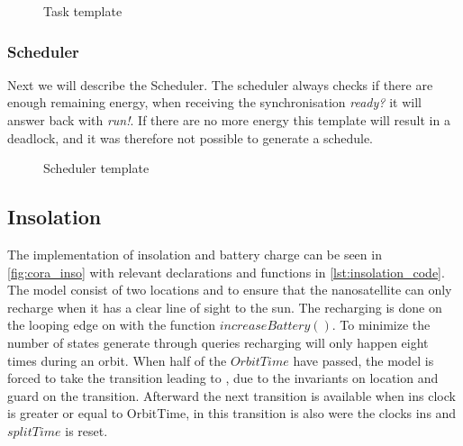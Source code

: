 \begin{figure}[H]
	\caption{Task template}
	\label{fig:cora_pro}
\end{figure}



\subsubsection*{Scheduler}
Next we will describe the Scheduler. The scheduler always checks if there are enough remaining energy, when receiving the synchronisation \textit{ready?} it will answer back with \textit{run!}. If there are no more energy this template will result in a deadlock, and it was therefore not possible to generate a schedule.

\begin{figure}[H]
	\centering
	\caption{Scheduler template}
	\label{fig:cora_schedule}
\end{figure}


\subsection*{Insolation}
The implementation of insolation and battery charge can be seen in \cref{fig:cora_inso} with relevant declarations and functions in \cref{lst:insolation_code}. The model consist of two locations  and  to ensure that the nanosatellite can only recharge when it has a clear line of sight to the sun. The recharging is done on the looping edge on  with the function $increaseBattery()$. To minimize the number of states generate through queries recharging will only happen eight times during an orbit. When half of the $OrbitTime$ have passed, the model is forced to take the transition leading to , due to the invariants on  location and guard on the transition. Afterward the next transition is available when ins clock is greater or equal to OrbitTime, in this transition is also were the clocks ins and $splitTime$ is reset.

